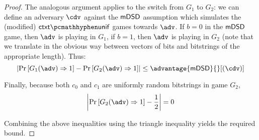 \begin{proof}
    The analogous argument applies to the switch from $G_1$ to $G_2$: we can define an adversary $\cdv$ against the $\mathsf{mDSD}$ assumption which simulates the (modified) $\ctxtunif$ games towards $\adv$. If $b=0$ in the $\mathsf{mDSD}$ game, then $\adv$ is playing in $G_1$, if $b=1$, then $\adv$ is playing in $G_2$ (note that we translate in the obvious way between vectors of bits and bitstrings of the appropriate length). Thus:
    \[ \left| \Pr\left[G_1(\adv) \Rightarrow 1\right] - \Pr\left[G_2(\adv) \Rightarrow 1\right] \right| \leq \advantage{\mdsd}{}[(\cdv)] \]

    Finally, because both $c_0$ and $c_1$ are uniformly random bitstrings in game $G_2$,
    \[ \left| \Pr\left[G_2(\adv) \Rightarrow 1\right] - \frac{1}{2} \right| = 0 \]

    Combining the above inequalities using the triangle inequality yields the required bound.
\end{proof}
